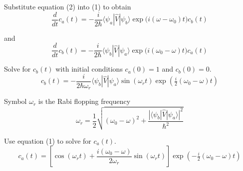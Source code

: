 Substitute equation (2) into (1) to obtain
\begin{equation*}
\frac{d}{dt}c_a(t)=-\frac{i}{2\hbar}\langle\psi_a|\hat V|\psi_b\rangle
\exp\bigl(i(\omega-\omega_0)t\bigr)c_b(t)
\tag{3}
\end{equation*}

and
\begin{equation*}
\frac{d}{dt}c_b(t)=-\frac{i}{2\hbar}\langle\psi_b|\hat V|\psi_a\rangle
\exp\bigl(i(\omega_0-\omega)t\bigr)c_a(t)
\tag{4}
\end{equation*}

Solve for $c_b(t)$ with initial conditions $c_a(0)=1$ and $c_b(0)=0$.
\begin{equation*}
c_b(t)=-\frac{i}{2\hbar\omega_r}\langle\psi_b|\hat V|\psi_a\rangle
\sin(\omega_rt)\exp\left(\tfrac{i}{2}(\omega_0-\omega)t\right)
\end{equation*}

Symbol $\omega_r$ is the Rabi flopping frequency
\begin{equation*}
\omega_r=\frac{1}{2}\sqrt{(\omega_0-\omega)^2
+\frac{|\langle\psi_b|\hat V|\psi_a\rangle|^2}{\hbar^2}}
\end{equation*}

Use equation (1) to solve for $c_a(t)$.
\begin{equation*}
c_a(t)=\left[\cos(\omega_rt)+\frac{i(\omega_0-\omega)}{2\omega_r}\sin(\omega_rt)\right]
\exp\left(-\tfrac{i}{2}(\omega_0-\omega)t\right)
\end{equation*}


